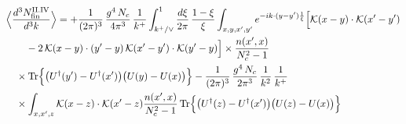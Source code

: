 \begingroup\small
\begin{align}\label{eq:S-II.IVrem}
&\Big\langle\frac{d^{3}N^{\rm II.IV}_{{\rm fin}}}{d^{3}k}\Big\rangle=+\frac{1}{(2\pi)^{3}}\, \frac{g^{4}\,N_{c}}{4\pi^{3}}\, \frac{1}{k^{+}} \int_{k^{+}/\vee}^{1}\frac{d\xi}{2\pi}\, \frac{1-\xi}{\xi} \int_{x,y,x',y'}e^{-ik\cdot(y-y')\frac{1}{\xi}}\Big[\mathcal{K}(x-y)\cdot\mathcal{K}(x'-y')\notag\\
&\quad\quad -2\, \mathcal{K}(x-y)\cdot(y'-y)\, \mathcal{K}(x'-y')\cdot\mathcal{K}(y'-y)\Big] \times\frac{n(x',x)}{N_{c}^{2}-1}\notag\\
&\quad \times {\rm Tr}\Big\{\big(U^{\dagger}(y')-U^{\dagger}(x')\big)\big(U(y)-U(x)\big)\Big\} -\frac{1}{(2\pi)^{3}}\, \frac{g^{4}\,N_{c}}{2\pi^{3}}\, \frac{1}{k^{2}}\, \frac{1}{k^{+}}\notag\\
&\quad \times \int_{x,x',z}\mathcal{K}(x-z)\cdot\mathcal{K}(x'-z)\frac{n(x',x)}{N_{c}^{2}-1}\, {\rm Tr}\Big\{\big(U^{\dagger}(z)-U^{\dagger}(x')\big)\big(U(z)-U(x)\big)\Big\}
\end{align}
\endgroup
